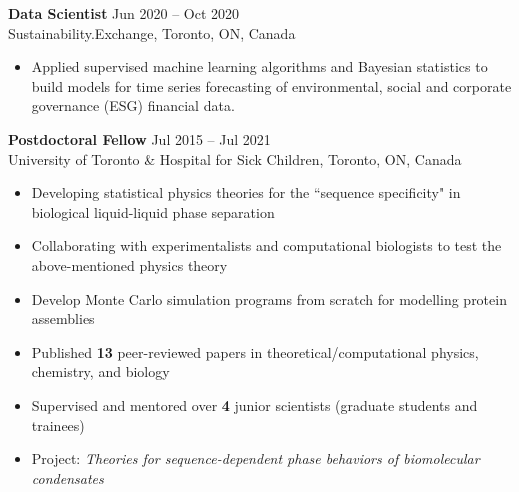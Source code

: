 \documentclass[11pt]{../yhlcv}
\begin{document}
{\bf Data Scientist} \hfill Jun 2020 -- Oct 2020 \vspace{0.25em} \\
Sustainability.Exchange, Toronto, ON, Canada
\vspace{-0.7em}\\
\begin{itemize}[leftmargin=*]\itemsep-0.2em
\item Applied supervised machine learning algorithms and Bayesian statistics to build models for time series
forecasting of environmental, social and corporate governance (ESG) financial data.
\end{itemize}

{\bf Postdoctoral Fellow} \hfill Jul 2015 -- Jul 2021 \vspace{0.25em} \\
University of Toronto \& Hospital for Sick Children, Toronto, ON, Canada
\vspace{-0.7em}\\
\begin{itemize}[leftmargin=*]\itemsep-0.2em
\item Developing statistical physics theories for the “sequence specificity" in biological liquid-liquid
phase separation
\item Collaborating with experimentalists and computational biologists to test the above-mentioned physics theory
\item Develop Monte Carlo simulation programs from scratch for modelling protein assemblies
\item Published {\bf 13} peer-reviewed papers in theoretical/computational physics, chemistry, and biology
\item Supervised and mentored over {\bf 4} junior scientists (graduate students and trainees)
\item Project: {\it Theories for sequence-dependent phase behaviors of biomolecular condensates}
\end{itemize}
\end{document}
